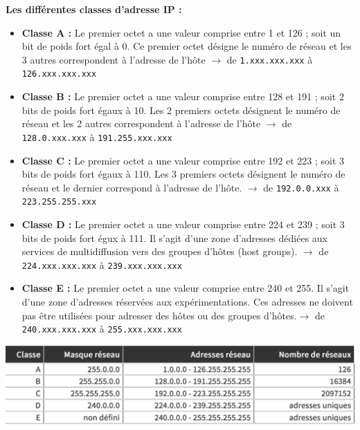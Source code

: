 \documentclass[a4paper,9pt, twocolumn]{article}
\begin{document}
	\textbf{Les différentes classes d'adresse IP :}
	\begin{itemize}
		\item \textbf{Classe A :} Le premier octet a une valeur comprise entre 1 et 126 ; soit un bit de poids fort égal à 0. Ce premier octet désigne le numéro de réseau et les 3 autres correspondent à l'adresse de l'hôte $\longrightarrow$ de \texttt{1.xxx.xxx.xxx} à \texttt{126.xxx.xxx.xxx}
		\item \textbf{Classe B :} Le premier octet a une valeur comprise entre 128 et 191 ; soit 2 bits de poids fort égaux à 10. Les 2 premiers octets désignent le numéro de réseau et les 2 autres correspondent à l'adresse de l'hôte $\longrightarrow$ de \texttt{128.0.xxx.xxx} à \texttt{191.255.xxx.xxx}
		\item \textbf{Classe C :} Le premier octet a une valeur comprise entre 192 et 223 ; soit 3 bits de poids fort égaux à 110. Les 3 premiers octets désignent le numéro de réseau et le dernier correspond à l'adresse de l'hôte. $\longrightarrow$ de \texttt{192.0.0.xxx} à \texttt{223.255.255.xxx}
		\item \textbf{Classe D :} Le premier octet a une valeur comprise entre 224 et 239 ; soit 3 bits de poids fort égux à 111. Il s'agit d'une zone d'adresses dédiées aux services de multidiffusion vers des groupes d'hôtes (host groups). $\longrightarrow$ de \texttt{224.xxx.xxx.xxx} à \texttt{239.xxx.xxx.xxx}
		\item \textbf{Classe E : }Le premier octet a une valeur comprise entre 240 et 255. Il s'agit d'une zone d'adresses réservées aux expérimentations. Ces adresses ne doivent pas être utilisées pour adresser des hôtes ou des groupes d'hôtes.$\longrightarrow$ de \texttt{240.xxx.xxx.xxx} à \texttt{255.xxx.xxx.xxx}
	\end{itemize}

	\includegraphics[scale=0.38]{masq.png}
	
\end{document}
